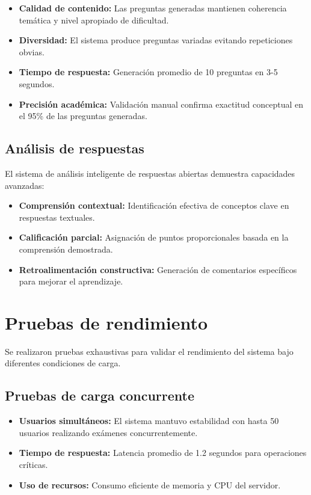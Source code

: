 \documentclass[12pt,a4paper]{report}
\begin{document}
\begin{itemize}
\item \textbf{Calidad de contenido:} Las preguntas generadas mantienen coherencia temática y nivel apropiado de dificultad.
\item \textbf{Diversidad:} El sistema produce preguntas variadas evitando repeticiones obvias.
\item \textbf{Tiempo de respuesta:} Generación promedio de 10 preguntas en 3-5 segundos.
\item \textbf{Precisión académica:} Validación manual confirma exactitud conceptual en el 95\% de las preguntas generadas.
\end{itemize}

\subsection{Análisis de respuestas}

El sistema de análisis inteligente de respuestas abiertas demuestra capacidades avanzadas:

\begin{itemize}
\item \textbf{Comprensión contextual:} Identificación efectiva de conceptos clave en respuestas textuales.
\item \textbf{Calificación parcial:} Asignación de puntos proporcionales basada en la comprensión demostrada.
\item \textbf{Retroalimentación constructiva:} Generación de comentarios específicos para mejorar el aprendizaje.
\end{itemize}

\section{Pruebas de rendimiento}

Se realizaron pruebas exhaustivas para validar el rendimiento del sistema bajo diferentes condiciones de carga.

\subsection{Pruebas de carga concurrente}

\begin{itemize}
\item \textbf{Usuarios simultáneos:} El sistema mantuvo estabilidad con hasta 50 usuarios realizando exámenes concurrentemente.
\item \textbf{Tiempo de respuesta:} Latencia promedio de 1.2 segundos para operaciones críticas.
\item \textbf{Uso de recursos:} Consumo eficiente de memoria y CPU del servidor.
\end{itemize}
\end{document}
